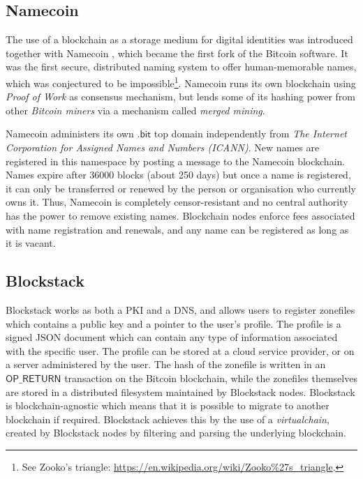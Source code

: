 \documentclass{style/kththesis}
\begin{document}
\subsection{Namecoin}
The use of a blockchain as a storage medium for digital identities was introduced together with Namecoin \cite{Kalodner15}, which became the first fork of the Bitcoin software. It was the first secure, distributed naming system to offer human-memorable names, which was conjectured to be impossible\footnote{See Zooko's triangle: \url{https://en.wikipedia.org/wiki/Zooko\%27s\_triangle}.}. Namecoin runs its own blockchain using \emph{Proof of Work} as consensus mechanism, but lends some of its hashing power from other \emph{Bitcoin miners} via a mechanism called \emph{merged mining}.

Namecoin administers its own $\mathsf{.bit}$ top domain independently from \emph{The Internet Corporation for Assigned Names and Numbers (ICANN)}. New names are registered in this namespace by posting a message to the Namecoin blockchain. Names expire after 36000 blocks (about 250 days) but once a name is registered, it can only be transferred or renewed by the person or organisation who currently owns it. Thus, Namecoin is completely censor-resistant and no central authority has the power to remove existing names. Blockchain nodes enforce fees associated with name registration and renewals, and any name can be registered as long as it is vacant.

\subsection{Blockstack}
Blockstack \cite{Ali16} works as both a PKI and a DNS, and allows users to register zonefiles which contains a public key and a pointer to the user's profile. The profile is a signed JSON document which can contain any type of information associated with the specific user. The profile can be stored at a cloud service provider, or on a server administered by the user. The hash of the zonefile is written in an $\mathsf{OP\_RETURN}$ transaction on the Bitcoin blockchain, while the zonefiles themselves are stored in a distributed filesystem maintained by Blockstack nodes. Blockstack is blockchain-agnostic which means that it is possible to migrate to another blockchain if required. Blockstack achieves this by the use of a \emph{virtualchain}, created by Blockstack nodes by filtering and parsing the underlying blockchain.
\end{document}
